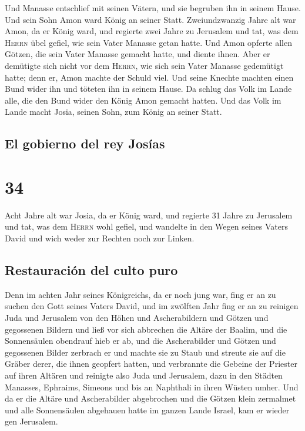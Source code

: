 Und Manasse entschlief mit seinen Vätern, und sie
begruben ihn in seinem Hause. Und sein Sohn Amon ward König an seiner
Statt.  Zweiundzwanzig Jahre alt war Amon, da er König
ward, und regierte zwei Jahre zu Jerusalem  und tat, was
dem \textsc{Herrn} übel gefiel, wie sein Vater Manasse getan hatte. Und
Amon opferte allen Götzen, die sein Vater Manasse gemacht hatte, und
diente ihnen.  Aber er demütigte sich nicht vor dem
\textsc{Herrn}, wie sich sein Vater Manasse gedemütigt hatte; denn er,
Amon machte der Schuld viel.  Und seine Knechte machten
einen Bund wider ihn und töteten ihn in seinem Hause.  Da
schlug das Volk im Lande alle, die den Bund wider den König Amon gemacht
hatten. Und das Volk im Lande macht Josia, seinen Sohn, zum König an
seiner Statt.

\hypertarget{el-gobierno-del-rey-josuxedas}{%
\subsection{El gobierno del rey
Josías}\label{el-gobierno-del-rey-josuxedas}}

\hypertarget{section-33}{%
\section{34}\label{section-33}}

 Acht Jahre alt war Josia, da er König ward, und regierte
31 Jahre zu Jerusalem  und tat, was dem \textsc{Herrn}
wohl gefiel, und wandelte in den Wegen seines Vaters David und wich
weder zur Rechten noch zur Linken.

\hypertarget{restauraciuxf3n-del-culto-puro}{%
\subsection{Restauración del culto
puro}\label{restauraciuxf3n-del-culto-puro}}

 Denn im achten Jahr seines Königreichs, da er noch jung
war, fing er an zu suchen den Gott seines Vaters David, und im zwölften
Jahr fing er an zu reinigen Juda und Jerusalem von den Höhen und
Ascherabildern und Götzen und gegossenen Bildern  und ließ
vor sich abbrechen die Altäre der Baalim, und die Sonnensäulen obendrauf
hieb er ab, und die Ascherabilder und Götzen und gegossenen Bilder
zerbrach er und machte sie zu Staub und streute sie auf die Gräber
derer, die ihnen geopfert hatten,  und verbrannte die
Gebeine der Priester auf ihren Altären und reinigte also Juda und
Jerusalem,  dazu in den Städten Manasses, Ephraims,
Simeons und bis an Naphthali in ihren Wüsten umher.  Und
da er die Altäre und Ascherabilder abgebrochen und die Götzen klein
zermalmet und alle Sonnensäulen abgehauen hatte im ganzen Lande Israel,
kam er wieder gen Jerusalem.

